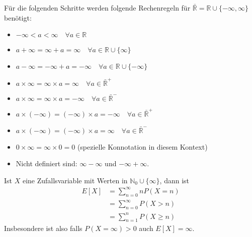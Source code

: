 \documentclass[a4paper,12pt]{article}
\begin{document}
Für die folgenden Schritte werden folgende Rechenregeln für $\bar{\mathbb{R}} = \mathbb{R} \cup \{-\infty, \infty\}$ benötigt:
\begin{itemize}
	\item $-\infty < a < \infty \quad \forall  a \in \mathbb{R}$
	\item $a + \infty = \infty + a = \infty \quad \forall a \in \mathbb{R}\cup \{\infty\}$
	\item $a - \infty = -\infty + a = - \infty \quad \forall a \in \mathbb{R}\cup \{-\infty\}$
	\item $a\times \infty = \infty \times a = \infty \quad \forall a \in \bar{\mathbb{R}}^+$
	\item $a\times \infty = \infty \times a = - \infty \quad \forall a \in \bar{\mathbb{R}}^-$
	\item $a \times (-\infty) = (-\infty) \times a = -\infty \quad \forall a \in \bar{\mathbb{R}}^+$
	\item $a \times (-\infty) = (-\infty) \times a = \infty \quad \forall a \in \bar{\mathbb{R}}^-$
	\item $0 \times \infty = \infty \times 0 = 0$ (spezielle Konnotation in diesem Kontext)
	\item Nicht definiert sind: $\infty -\infty$ und $-\infty + \infty$.
\end{itemize}
Ist $X$ eine Zufallsvariable mit Werten in $\mathbb{N}_0\cup\{\infty\}$, dann ist
\begin{align*}
	E[X] & = \sum_{n=0}^{\infty}nP(X = n) \\
	     & = \sum_{n=0}^{\infty}P(X > n)  \\
	     & = \sum_{n=1}^{n}P(X \geq n)
\end{align*}
Insbesondere ist also falls $P(X = \infty) > 0$ auch $E[X] = \infty$.
\end{document}
